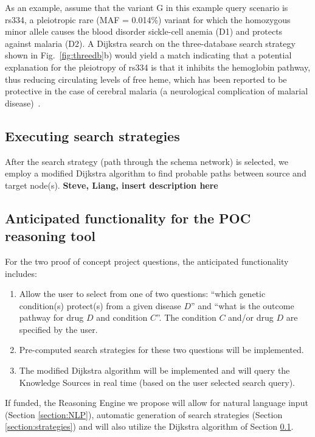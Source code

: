 \documentclass[11pt,notitlepage]{article}
\begin{document}
As an example, assume that the variant G in this example query scenario is rs334, a pleiotropic rare (MAF = 0.014\%) variant for which the homozygous minor allele causes the blood disorder sickle-cell anemia (D1) and protects against malaria (D2). A Dijkstra search on the three-database search strategy shown in Fig.~\ref{fig:threedb}b) would yield a match indicating that a potential explanation for the pleiotropy of rs334 is that it inhibits the hemoglobin pathway, thus reducing circulating levels of free heme, which has been reported to be protective in the case of cerebral malaria (a neurological complication of malarial disease)~\cite{Ferreira:2011ff}.

\subsection{Executing search strategies}
\label{section:Dijkstra}
After the search strategy (path through the schema network) is selected, we employ a modified Dijkstra algorithm to find probable paths between source and target node(s).
\textbf{Steve, Liang, insert description here}



\subsection{Anticipated functionality for the POC reasoning tool}
For the two proof of concept project questions, the anticipated functionality includes:
\begin{enumerate}
\item Allow the user to select from one of two questions: ``which genetic condition(s) protect(s) from a given disease $D$'' and ``what is the outcome pathway for drug $D$ and condition $C$''. The condition $C$ and/or drug $D$ are specified by the user.
\item Pre-computed search strategies for these two questions will be implemented.
\item The modified Dijkstra algorithm will be implemented and will query the Knowledge Sources in real time (based on the user selected search query).
\end{enumerate}
If funded, the Reasoning Engine we propose will allow for natural language input (Section \ref{section:NLP}), automatic generation of search strategies (Section \ref{section:strategies}) and will also utilize the Dijkstra algorithm of Section \ref{section:Dijkstra}.
\end{document}
